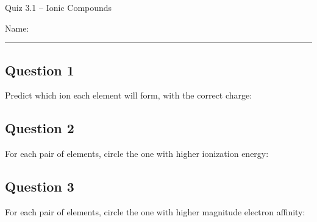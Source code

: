\documentclass[11pt, letterpaper]{memoir}
\begin{document}
	\begin{center}
		{\large Quiz 3.1 --	Ionic Compounds}
	\end{center}
	{\large Name: \rule[-1mm]{4in}{.1pt} 


\subsection*{Question 1}
Predict which ion each element will form, with the correct charge:


\vspace{2em}
\subsection*{Question 2}
For each pair of elements, circle the one with higher ionization energy:


\subsection*{Question 3}
For each pair of elements, circle the one with higher magnitude electron affinity:


}
\end{document}
